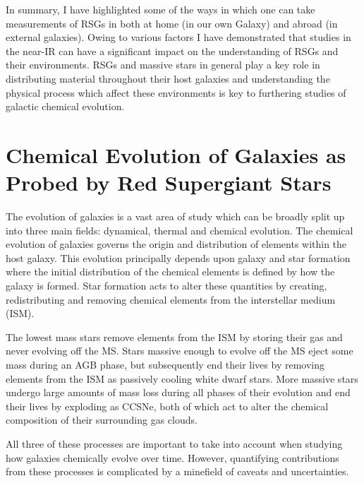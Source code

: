 In summary, I have highlighted some of the ways in which one can take measurements of RSGs in both at home (in our own Galaxy) and abroad (in external galaxies).
Owing to various factors I have demonstrated that studies in the near-IR can have a significant impact on the understanding of RSGs and their environments.
RSGs and massive stars in general play a key role in distributing material throughout their host galaxies and understanding the physical process which affect these environments is key to furthering studies of galactic chemical evolution.




\section{Chemical Evolution of Galaxies as Probed by Red Supergiant Stars} %
\label{sec:chemical evolution}


The evolution of galaxies is a vast area of study which can be broadly split up into three main fields: dynamical, thermal and chemical evolution.
The chemical evolution of galaxies governs the origin and distribution of elements within the host galaxy.
This evolution principally depends upon galaxy and star formation where
the initial distribution of the chemical elements is defined by how the galaxy is formed.
Star formation acts to alter these quantities by creating, redistributing and removing chemical elements from the interstellar medium (ISM).

The lowest mass stars remove elements from the ISM by storing their gas and never evolving off the MS.
Stars massive enough to evolve off the MS eject some mass during an AGB phase, but subsequently end their lives by removing elements from the ISM as passively cooling white dwarf stars.
More massive stars undergo large amounts of mass loss during all phases of their evolution and end their lives by exploding as CCSNe, both of which act to alter the chemical composition of their surrounding gas clouds.

All three of these processes are important to take into account when studying how galaxies chemically evolve over time.
However, quantifying contributions from these processes is complicated by a minefield of caveats and uncertainties.

